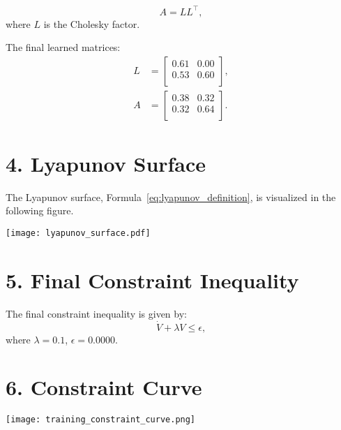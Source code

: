 \documentclass[11pt]{article}
\begin{document}
\begin{equation}
A = L L^\top,
\end{equation}
where $L$ is the Cholesky factor.

The final learned matrices:
\begin{align}
L &= \begin{bmatrix}
0.61 & 0.00 \\
0.53 & 0.60 \\
\end{bmatrix}, \\
A &= \begin{bmatrix}
0.38 & 0.32 \\
0.32 & 0.64 \\
\end{bmatrix}.
\end{align}

\section*{4. Lyapunov Surface}
The Lyapunov surface, Formula~\eqref{eq:lyapunov_definition}, is visualized in the following figure.
\begin{center}
\texttt{[image: lyapunov\_surface.pdf]}
\end{center}

\section*{5. Final Constraint Inequality}
The final constraint inequality is given by:
\begin{equation}
\dot{V} + \lambda V \leq \epsilon,
\end{equation}
where $\lambda = 0.1$, $\epsilon = 0.0000$.

\section*{6. Constraint Curve}
\texttt{[image: training\_constraint\_curve.png]}
\end{document}
